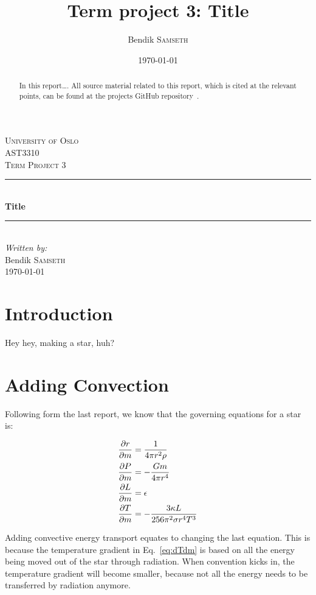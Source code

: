 \documentclass[11pt,twocolumn]{article}
\title{Term project 3: Title}
\author{Bendik \textsc{Samseth}}
\date{\today}
\begin{document}
\begin{titlepage}
  \newcommand{\HRule}{\rule{\linewidth}{0.5mm}}
  \center
  \textsc{\LARGE University of Oslo}\\[1.5cm]
  \textsc{\Large AST3310}\\[0.5cm]
  \textsc{\large Term Project 3}\\[0.5cm]
  \HRule \\[0.4cm]
  { \huge \bfseries Title}\\[0.4cm]
  \HRule \\[1.5cm]
  \Large \emph{Written by:}\\
  Bendik \textsc{Samseth}\\[3cm]
  {\large \today}\\[3cm]
  \vfill
\end{titlepage}


\onecolumn
  \tableofcontents
  \begin{abstract}

    In this report\ldots. All source material related to this report, which
    is cited at the relevant points, can be found at the projects
    GitHub repository~\cite{github}.

  \end{abstract}
\pagebreak
\twocolumn


\section{Introduction}

Hey hey, making a star, huh?


\section{Adding Convection}

Following form the last report, we know that the governing equations for a star is:

\begin{align}
  \frac{\partial r}{\partial m} &= \frac{ 1 }{ 4\pi r^2\rho }\label{eq:drdm}\\
  \frac{\partial P}{\partial m} &= - \frac{ Gm }{ 4\pi r^4 }\label{eq:dPdm}\\
  \frac{\partial L}{\partial m} &= \epsilon\label{eq:dLdm}\\
  \frac{\partial T}{\partial m} &= - \frac{ 3\kappa L }{ 256 \pi^2 \sigma r^4T^3 }\label{eq:dTdm}
\end{align}

Adding convective energy transport equates to changing the last equation. This is because the temperature gradient in Eq.~\eqref{eq:dTdm} is based on all the energy being moved out of the star through radiation. When convention kicks in, the temperature gradient will become smaller, because not all the energy needs to be transferred by radiation anymore.
\end{document}
